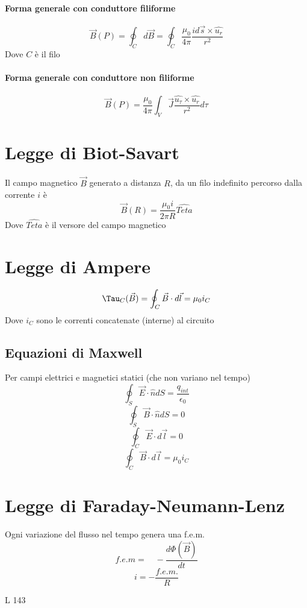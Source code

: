 \documentclass[a4paper]{report}
\begin{document}
  \paragraph{Forma generale con conduttore filiforme}
  \[ \vec{B}(P) = \oint_C d\vec{B} = \oint_C \frac{\mu_0}{4\pi} \frac{id\vec{s} \times \hat{u_r}}{r^2}\]
  Dove $C$ è il filo
  \paragraph{Forma generale con conduttore non filiforme}
  \[ \vec{B}(P) = \frac{\mu_0}{4\pi} \int_V \vec{J}\frac{\hat{u_\tau} \times \hat{u_r}}{r^2} d\tau \]

  \section{Legge di Biot-Savart}
  Il campo magnetico $\vec{B}$ generato a distanza $R$, da un filo indefinito percorso dalla corrente $i$ è
  \[ \vec{B}(R) = \frac{\mu_0 i}{2 \pi R} \hat{Teta} \]
  Dove $\hat{Teta}$ è il versore del campo magnetico

  \section{Legge di Ampere}
  \[ \Tau_C (\vec{B}) = \oint_C \vec{B} \cdot d\vec{l} = \mu_0 i_C \]
  Dove $i_C$ sono le correnti concatenate (interne) al circuito

  \subsection{Equazioni di Maxwell}
  Per campi elettrici e magnetici statici (che non variano nel tempo)
  \[ \oint_S \vec{E}\cdot \hat{n} dS = \frac{q_{int}}{\epsilon_0} \]
  \[ \oint_S \vec{B}\cdot \hat{n} dS = 0 \]
  \[ \oint_C \vec{E}\cdot d\vec{l} = 0 \]
  \[ \oint_C \vec{B} \cdot d\vec{l} = \mu_0 i_C \]

  \section{Legge di Faraday-Neumann-Lenz}
  Ogni variazione del flusso nel tempo genera una f.e.m.
  \[f.e.m = \quad -\frac{d\Phi(\vec{B})}{dt} \]
  \[ i = -\frac{f.e.m.}{R} \]


L 143
\end{document}
